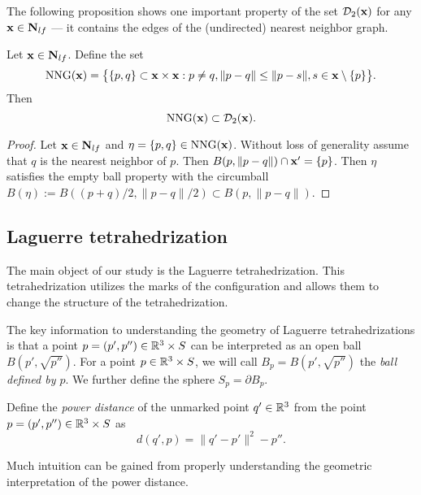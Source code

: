 \noindent The following proposition shows one important property of the set $\mathcal D_2({\mathbf{x}})$ for any ${\mathbf{x}} \in \mathbf N_{lf}$ --- it contains the edges of the (undirected) nearest neighbor graph.
\begin{proposition}\label{prop:nng}
	Let ${\mathbf{x}}\in\mathbf N_{lf}$. Define the set
	$$\mathrm{NNG}({\mathbf{x}}) = \big\{ \{p,q\}\subset {\mathbf{x}} \times {\mathbf{x}}: p\neq q, \|p-q\| \leq \|p-s\|, s\in {\mathbf{x}}\setminus\{p\}  \big\}.$$
	Then 
	$$\mathrm{NNG}({\mathbf{x}}) \subset \mathcal D_2({\mathbf{x}}).$$
\end{proposition}
\begin{proof}
	Let ${\mathbf{x}}\in \mathbf N_{lf}$ and $\eta =\{p,q\} \in \mathrm{NNG}({\mathbf{x}})$. Without loss of generality assume that $q$ is the nearest neighbor of $p$. Then $ B(p,\|p-q\|)\cap {\mathbf{x}}' = \{p\}$. Then $\eta$ satisfies the empty ball property with the circumball $ B(\eta) := B((p+q)/2,\|p-q\|/2) \subset B(p,\|p-q\|)$.
\end{proof}



\subsection{Laguerre tetrahedrization}\label{sec:Laguerre}
The main object of our study is the Laguerre tetrahedrization. This tetrahedrization utilizes the marks of the configuration and allows them to change the structure of the tetrahedrization.

The key information to understanding the geometry of Laguerre tetrahedrizations is that a point $p=(p',p'')\in {\mathbb R^3}\times S$ can be interpreted as an open ball $B(p',\sqrt{p''})$. For a point $p\in {\mathbb R^3} \times S$, we will call $B_p = B(p',\sqrt{p''})$ the \textit{ball defined by $p$}. We further define the sphere $S_p=\partial B_p$. 


\begin{definition}
	Define the \textit{power distance} of the unmarked point $q'\in {\mathbb R^3}$ from the point $p=(p',p'')\in{\mathbb R^3}\times S$ as
	$$d(q',p) = \|q'-p'\|^2 - p''.$$
\end{definition}
Much intuition can be gained from properly understanding the geometric interpretation of the power distance.





